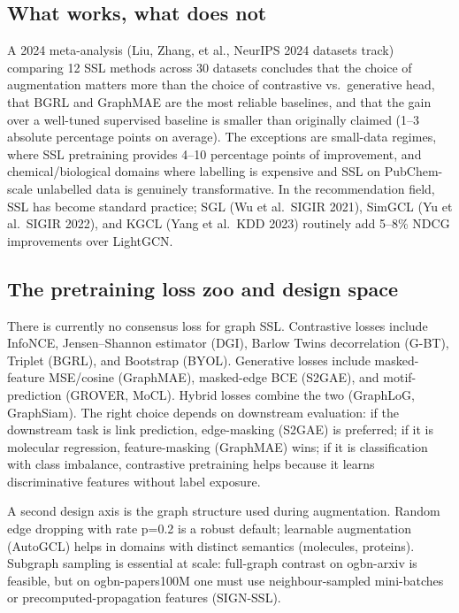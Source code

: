 \subsection{What works, what does not}\label{what-works-what-does-not}

A 2024 meta-analysis (Liu, Zhang, et al., NeurIPS 2024 datasets track) comparing 12 SSL methods across 30 datasets concludes that the choice of augmentation matters more than the choice of contrastive vs.~generative head, that BGRL and GraphMAE are the most reliable baselines, and that the gain over a well-tuned supervised baseline is smaller than originally claimed (1--3 absolute percentage points on average). The exceptions are small-data regimes, where SSL pretraining provides 4--10 percentage points of improvement, and chemical/biological domains where labelling is expensive and SSL on PubChem-scale unlabelled data is genuinely transformative. In the recommendation field, SSL has become standard practice; SGL (Wu et al.~SIGIR 2021), SimGCL (Yu et al.~SIGIR 2022), and KGCL (Yang et al.~KDD 2023) routinely add 5--8\% NDCG improvements over LightGCN.

\subsection{The pretraining loss zoo and design space}\label{the-pretraining-loss-zoo-and-design-space}

There is currently no consensus loss for graph SSL. Contrastive losses include InfoNCE, Jensen--Shannon estimator (DGI), Barlow Twins decorrelation (G-BT), Triplet (BGRL), and Bootstrap (BYOL). Generative losses include masked-feature MSE/cosine (GraphMAE), masked-edge BCE (S2GAE), and motif-prediction (GROVER, MoCL). Hybrid losses combine the two (GraphLoG, GraphSiam). The right choice depends on downstream evaluation: if the downstream task is link prediction, edge-masking (S2GAE) is preferred; if it is molecular regression, feature-masking (GraphMAE) wins; if it is classification with class imbalance, contrastive pretraining helps because it learns discriminative features without label exposure.

A second design axis is the graph structure used during augmentation. Random edge dropping with rate p=0.2 is a robust default; learnable augmentation (AutoGCL) helps in domains with distinct semantics (molecules, proteins). Subgraph sampling is essential at scale: full-graph contrast on ogbn-arxiv is feasible, but on ogbn-papers100M one must use neighbour-sampled mini-batches or precomputed-propagation features (SIGN-SSL).

